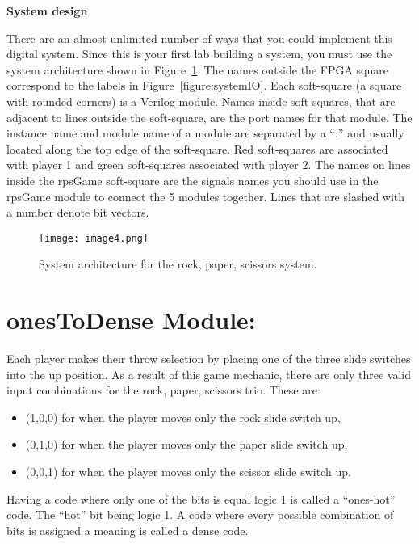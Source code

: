 \textbf{System design}

There are an almost unlimited number of ways that you could implement
this digital system. Since this is your first lab building a system, you
must use the system architecture shown in Figure~\ref{fig:sysArch}. The names outside
the FPGA square correspond to the labels in Figure~\ref{figure:systemIO}. Each soft-square
(a square with rounded corners) is a Verilog module. Names inside
soft-squares, that are adjacent to lines outside the soft-square, are
the port names for that module. The instance name and module name of a
module are separated by a ``:'' and usually located along the top edge
of the soft-square. Red soft-squares are associated with player 1 and
green soft-squares associated with player 2. The names on lines inside
the rpsGame soft-square are the signals names you should use in the
rpsGame module to connect the 5 modules together. Lines that are slashed
with a number denote bit vectors.

\begin{figure}[ht]
\texttt{[image:  image4.png]}
\caption{System architecture for the rock, paper, scissors system.}
\label{fig:sysArch}
\end{figure}

\hypertarget{onestodense-module}{%
\section{onesToDense Module:}
\label{onestodense-module}}

Each player makes their throw selection by placing one of the three
slide switches into the up position. As a result of this game mechanic,
there are only three valid input combinations for the rock, paper,
scissors trio. These are:

\begin{itemize}
\item
  (1,0,0) for when the player moves only the rock slide switch up,
\item
  (0,1,0) for when the player moves only the paper slide switch up,
\item
  (0,0,1) for when the player moves only the scissor slide switch up.
\end{itemize}

Having a code where only one of the bits is equal logic 1 is called a
``ones-hot'' code. The ``hot'' bit being logic 1. A code where every
possible combination of bits is assigned a meaning is called a dense
code.


